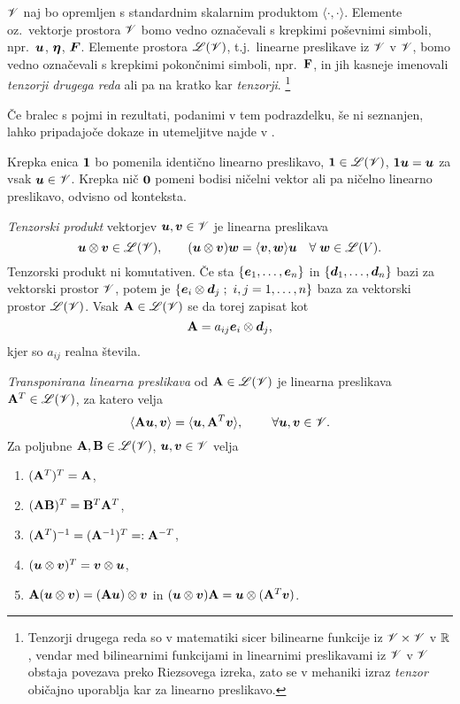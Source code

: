 $\mathscr V$ naj bo opremljen s standardnim skalarnim produktom $\langle\cdot,\cdot\rangle$.
Elemente oz.~vektorje prostora $\mathscr V$ bomo vedno označevali s krepkimi poševni\-mi simboli,
npr.~$\boldsymbol u$, $\boldsymbol \eta$, $\boldsymbol F$. Elemente prostora $\mathscr L(\mathscr V)$, t.j.~linearne
preslikave iz $\mathscr V$ v $\mathscr V$, bomo vedno označevali s krepkimi pokončnimi simboli, npr.~$\mathbf F$,
in jih kasneje imenovali \emph{tenzorji drugega reda} ali pa na kratko kar \emph{tenzorji}.
\footnote{Tenzorji drugega reda so v matematiki sicer bilinearne funkcije iz $\mathscr V\times\mathscr V$ v $\mathbb R$, vendar med 
bilinearnimi funkcijami in linearnimi preslikavami iz $\mathscr V$ v $\mathscr V$
obstaja povezava preko Riezsovega izreka, zato se v mehaniki
izraz \textit{tenzor} običajno uporablja kar za linearno preslikavo.}

Če bralec s pojmi in rezultati, podanimi v tem podrazdelku, še ni seznanjen, lahko
pripadajoče dokaze in utemeljitve najde v \cite[str.~233-261]{liu}.

Krepka enica $\mathbf 1$ bo pomenila identično linearno preslikavo, $\mathbf 1\in\mathscr L(\mathscr V)$,
$\mathbf 1\boldsymbol u=\boldsymbol u$ za vsak $\boldsymbol u\in\mathscr V$. Krepka nič $\mathbf 0$ pomeni bodisi
ničelni vektor ali pa ničelno linearno preslikavo, odvisno od konteksta.

\emph{Tenzorski produkt} vektorjev $\boldsymbol u,\boldsymbol v\in\mathscr V$ je linearna preslikava
\[
	\boldsymbol u\otimes\boldsymbol v\in\mathscr L(\mathscr V),\qquad
	(\boldsymbol u\otimes\boldsymbol v)\boldsymbol w=\langle\boldsymbol v,\boldsymbol w\rangle\boldsymbol u\quad\forall\;\boldsymbol w\in\mathscr L(V).
\]
Tenzorski produkt ni komutativen. Če sta $\{\boldsymbol e_1,\dots,\boldsymbol e_n\}$ in
$\{\boldsymbol d_1,\dots,\boldsymbol d_n\}$ bazi za vektorski prostor $\mathscr V$, potem je
$\{\vek{e}_i\otimes\vek{d}_j\;;\ i,j=1,\dots,n\}$ baza za vektorski prostor $\mathscr L(\mathscr V)$.
Vsak $\mathbf A\in\mathscr L(\mathscr V)$ se da torej zapisat kot
\[
	\mathbf A=a_{ij}\boldsymbol e_i\otimes\boldsymbol d_j,
\]
kjer so $a_{ij}$ realna števila.

\emph{Transponirana linearna preslikava} od $\mathbf A\in\mathscr L(\mathscr V)$ je linearna preslikava
$\mathbf A^T\in\mathscr L(\mathscr V)$, za katero velja
\[
	\langle\mathbf A\boldsymbol u,\boldsymbol v\rangle=\langle\boldsymbol u,\mathbf A^T\boldsymbol v\rangle,
	\qquad\;\forall \boldsymbol u,\boldsymbol v\in\mathscr V.
\]
Za poljubne $\mathbf A,\mathbf B\in\mathscr L(\mathscr V)$, $\boldsymbol u,\boldsymbol v\in\mathscr V$ velja
\begin{enumerate}[noitemsep]
	\item $(\mathbf A^T)^T=\mathbf A$,
	\item $(\mathbf A\mathbf B)^T=\mathbf B^T\mathbf A^T$,
	\item $(\mathbf A^T)^{-1}=(\mathbf A^{-1})^T=:\mathbf A^{-T}$,
	\item $(\boldsymbol u\otimes\boldsymbol v)^T=\boldsymbol v\otimes\boldsymbol u$,
	\item $\mathbf A(\boldsymbol u\otimes\boldsymbol v)=(\mathbf A\boldsymbol u)\otimes\boldsymbol v$ in
		$(\boldsymbol u\otimes\boldsymbol v)\mathbf A=\boldsymbol u\otimes(\mathbf A^T\boldsymbol v)$.
\end{enumerate}

